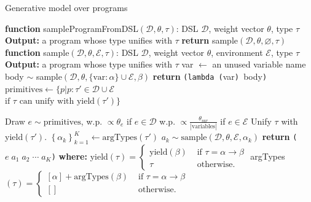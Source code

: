 \documentclass{article}
\newcommand{\code}[1]{{\footnotesize\texttt{#1}}}
\begin{document}
\begin{algorithm}[tb]
   \caption{Generative model over programs}
   \label{programGenerativeModel}
   \begin{algorithmic}
     \STATE \textbf{function} sampleProgramFromDSL$(\mathcal{D}, \theta, \tau)$:
   DSL $\mathcal{D}$, weight vector $\theta$, type $\tau$
  \STATE \textbf{Output:} a program whose type unifies with $\tau$
  \STATE \textbf{return} sample$(\mathcal{D}, \theta, \varnothing, \tau)$
\STATE
     \STATE \textbf{function} sample$(\mathcal{D}, \theta, \mathcal{E}, \tau)$:
   DSL $\mathcal{D}$, weight vector $\theta$, environment $\mathcal{E}$, type $\tau$
  \STATE \textbf{Output:} a program whose type unifies with $\tau$
  \IF{$\tau = \alpha\to\beta$}
  \STATE var $\gets$ an unused variable name
  \STATE body $\sim$ sample$(\mathcal{D},\theta,\{\text{var}:\alpha\}\cup\mathcal{E},\beta)$
   \STATE \textbf{return} \code{(lambda (}var\code{) }body\code{)}
   \ENDIF
   \STATE $\text{primitives} \gets\{p | p: \tau' \in \mathcal{D}\cup\mathcal{E}$ \\
     \hspace*{6.9em}$\text{if }\tau\text{ can unify with yield}(\tau') \} $
   
   \STATE Draw $e\sim \text{primitives}$, w.p. $\propto\theta_e$ if $e\in \mathcal{D}$
   \STATE \hspace*{8.8em}w.p. $\propto\frac{\theta_{var}}{|\text{variables}|}$ if $e\in \mathcal{E}$
   \STATE Unify $\tau$ with yield$(\tau')$.
   \STATE $\left\{\alpha_k \right\}_{k = 1}^K\gets\text{argTypes}(\tau')$ 
 \STATE $a_k\sim\text{sample}(\mathcal{D},\theta,\mathcal{E},\alpha_k)$
 \ENDFOR
 \STATE \textbf{return} \code{(}$e\;a_1\; a_2\; \cdots\; a_K$\code{)}
 \STATE\textbf{where:}
 \STATE \quad yield$(\tau) = \begin{cases}
    \text{yield}(\beta)   &\text{ if }\tau = \alpha\to \beta\\
    \tau   &\text{ otherwise.}
 \end{cases}$ 
 \STATE \quad argTypes$(\tau) = \begin{cases}
    [\alpha] + \text{argTypes}(\beta)   &\text{ if }\tau = \alpha\to \beta\\
    []   &\text{ otherwise.}
 \end{cases}$
\end{algorithmic}
\end{algorithm}
\end{document}
